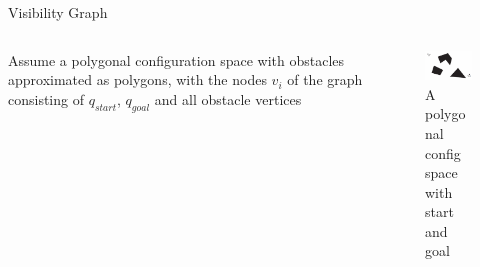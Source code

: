 \documentclass[handout]{beamer}
\begin{document}
  \begin{frame}{Visibility Graph}

    \begin{columns}
      \begin{column}[]{0.4\textwidth}
        Assume a polygonal configuration space with obstacles approximated as polygons, with the nodes $v_{i}$ of the graph consisting of $q_{start}$, $q_{goal}$ and all obstacle vertices
      \end{column}
      \begin{column}[]{0.6\textwidth}
        \begin{center}
        \begin{figure}
          \includegraphics[width=60mm]{fig/fig_02_poly_cofig_space.png}
          \caption{A polygonal config space with start and goal}
          \label{fig:fig02}
        \end{figure}
       \end{center}
      \end{column}
    \end{columns}
    
  \end{frame}
\end{document}
